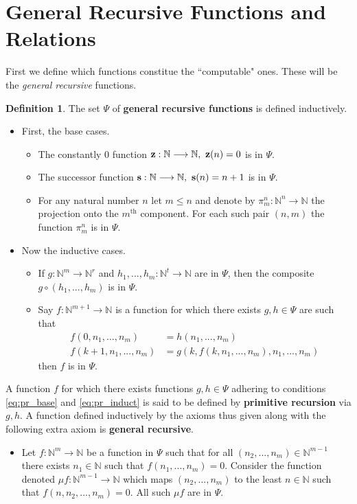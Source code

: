 \documentclass[12pt]{article}
\theoremstyle{plain}
\theoremstyle{definition}
\newtheorem{defn}[thm]{Definition} %
\newcommand{\bb}[1]{\mathbb{#1}}
\newcommand{\lto}{\longrightarrow}
\begin{document}
	\section{General Recursive Functions and Relations}\label{sec:prim_rec}
	First we define which functions constitue the ``computable" ones. These will be the \emph{general recursive} functions.
	\begin{defn}\label{def:primitive_recursive}
		The set $\Psi$ of \textbf{general recursive functions} is defined inductively.
		\begin{itemize}
			\item First, the base cases.
			\begin{itemize}
				\item The constantly $0$ function $\bold{z}: \bb{N} \lto \bb{N},\text{ }\bold{z}(n) = 0$ is in $\Psi$.
				\item The successor function $\bold{s}: \bb{N} \lto \bb{N},\text{ }\bold{s}(n) = n+1$ is in $\Psi$.
				\item For any natural number $n$ let $m \leq n$ and denote by $\pi_m^n: \bb{N}^n \lto \bb{N}$ the projection onto the $m^\text{th}$ component. For each such pair $(n,m)$ the function $\pi^n_m$ is in $\Psi$.
			\end{itemize}
			\item Now the inductive cases.
			\begin{itemize}
				\item If $g: \bb{N}^m \lto \bb{N}^r$ and $h_1,...,h_m: \bb{N}^t \lto \bb{N}$ are in $\Psi$, then the composite $g \circ (h_1,...,h_m)$ is in $\Psi$.
				\item Say $f: \bb{N}^{m+1} \lto \bb{N}$ is a function for which there exists $g,h \in \Psi$ are such that
				\begin{align}
					f(0,n_1,...,n_m) &= h(n_1,...,n_m)\label{eq:pr_base}\\
					f(k+1,n_1,...,n_m) &= g(k, f(k, n_1,...,n_m),n_1,...,n_m)\label{eq:pr_induct}
				\end{align}
				then $f$ is in $\Psi$.
			\end{itemize}
		\end{itemize}
		A function $f$ for which there exists functions $g,h \in \Psi$ adhering to conditions \eqref{eq:pr_base} and \eqref{eq:pr_induct} is said to be defined by \textbf{primitive recursion} via $g,h$. A function defined inductively by the axioms thus given along with the following extra axiom is \textbf{general recursive}.
		\begin{itemize}
			\item Let $f: \bb{N}^m \lto \bb{N}$ be a function in $\Psi$ such that for all $(n_2,...,n_m) \in \bb{N}^{m-1}$ there exists $n_1 \in \bb{N}$ such that $f(n_1,...,n_m) = 0$. Consider the function denoted $\mu f: \bb{N}^{m-1} \lto \bb{N}$ which maps $(n_2,...,n_m)$ to the least $n \in \bb{N}$ such that $f(n,n_2,...,n_m) = 0$. All such $\mu f$ are in $\Psi$.
		\end{itemize}
		

\end{defn}
\end{document}
